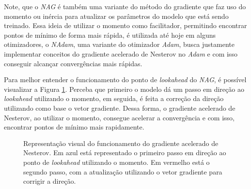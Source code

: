 Note, que o \textit{NAG} é também uma variante do método do gradiente que faz uso do momento ou inércia para atualizar os parâmetros do modelo que está sendo treinado. Essa ideia de utilizar o momento como facilitador, permitindo encontrar pontos de mínimo de forma mais rápida, é utilizada até hoje em alguns otimizadores, o \textit{NAdam}, uma variante do otimizador \textit{Adam}, busca justamente implementar conceitos do gradiente acelerado de Nesterov no \textit{Adam} e com isso conseguir alcançar convergências mais rápidas.

Para melhor entender o funcionamento do ponto de \textit{lookahead} do \textit{NAG}, é possível visualizar a Figura \ref{fig:funcionamento-nag}. Perceba que primeiro o modelo dá um passo em direção ao \textit{lookahead} utilizando o momento, em seguida, é feita a correção da direção utilizando como base o vetor gradiente. Dessa forma, o gradiente acelerado de Nesterov, ao utilizar o momento, consegue acelerar a convergência e com isso, encontrar pontos de mínimo mais rapidamente.

\begin{figure}[h!]
    \centering
    \caption{Representação visual do funcionamento do gradiente acelerado de Nesterov. Em azul está representado o primeiro passo em direção ao ponto de \textit{lookahead} utilizando o momento. Em vermelho está o segundo passo, com a atualização utilizando o vetor gradiente para corrigir a direção.}
    \label{fig:funcionamento-nag}
\end{figure}

